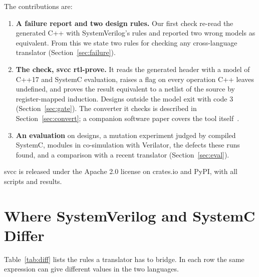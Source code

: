 \documentclass[conference]{IEEEtran}
\newcommand{\code}[1]{{\fontshape{n}\ttfamily #1}}
\begin{document}
The contributions are:
\begin{enumerate}
\item \textbf{A failure report and two design rules.} Our first check re-read the generated C++
with SystemVerilog's rules and reported two wrong models as equivalent. From this we state two
rules for checking any cross-language translator (Section~\ref{sec:failure}).
\item \textbf{The check, \code{svcc rtl-prove}.} It reads the generated header with a model of
C++17 and SystemC evaluation, raises a flag on every operation C++ leaves undefined, and proves the
result equivalent to a netlist of the source by register-mapped induction. Designs outside the
model exit with code 3 (Section~\ref{sec:gate}). The converter it checks is described in
Section~\ref{sec:convert}; a companion software paper covers the tool itself~\cite{kubavat2026svccsx}.
\item \textbf{An evaluation} on \nDesigns{} designs, a mutation experiment judged by compiled
SystemC, \nModules{} modules in co-simulation with Verilator, the defects these runs found, and a
comparison with a recent translator (Section~\ref{sec:eval}).
\end{enumerate}
\code{svcc} is released under the Apache 2.0 license on crates.io and PyPI, with all scripts and
results.

\section{Where SystemVerilog and SystemC Differ}
\label{sec:diff}

Table~\ref{tab:diff} lists the rules a translator has to bridge. In each row the same expression
can give different values in the two languages.
\end{document}
